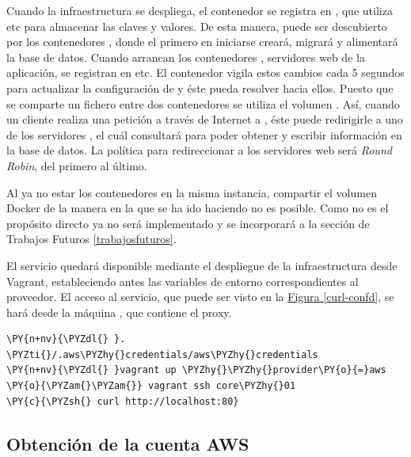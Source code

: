 Cuando la infraestructura se despliega, el contenedor  se registra en , que utiliza etc para almacenar las claves y valores. De esta manera,  puede ser descubierto por los contenedores , donde el primero en iniciarse creará, migrará y alimentará la base de datos. Cuando arrancan los contenedores , servidores web de la aplicación, se registran en etc. El contenedor  vigila estos cambios cada 5 segundos para actualizar la configuración de  y éste pueda resolver hacia ellos. Puesto que se comparte un fichero entre dos contenedores se utiliza el volumen . Así, cuando un cliente realiza una petición a través de Internet a , éste puede redirigirle a uno de los servidores , el cuál consultará  para poder obtener y escribir información en la base de datos. La política para redireccionar a los servidores web será \textit{Round Robin}, del primero al último.

Al ya no estar los contenedores en la misma instancia, compartir el volumen Docker  de la manera en la que se ha ido haciendo no es posible. Como no es el propósito directo ya no será implementado y se incorporará a la sección de Trabajos Futuros \hyperref[trabajosfuturos]{\ref{trabajosfuturos}}.

El servicio quedará disponible mediante el despliegue de la infraestructura desde Vagrant, estableciendo antes las variables de entorno correspondientes al proveedor. El acceso al servicio, que puede ser visto en la \hyperref[curl-confd]{Figura \ref{curl-confd}}, se hará desde la máquina , que contiene el proxy.

\begin{framed_shaded}
\begin{Verbatim}[fontsize=\relsize{-2.5},fontseries=b,commandchars=\\\{\}]
\PY{n+nv}{\PYZdl{} }. \PYZti{}/.aws\PYZhy{}credentials/aws\PYZhy{}credentials
\PY{n+nv}{\PYZdl{} }vagrant up \PYZhy{}\PYZhy{}provider\PY{o}{=}aws \PY{o}{\PYZam{}\PYZam{}} vagrant ssh core\PYZhy{}01
\PY{c}{\PYZsh{} curl http://localhost:80}
\end{Verbatim}
\end{framed_shaded}

\subsection{Obtención de la cuenta AWS}

